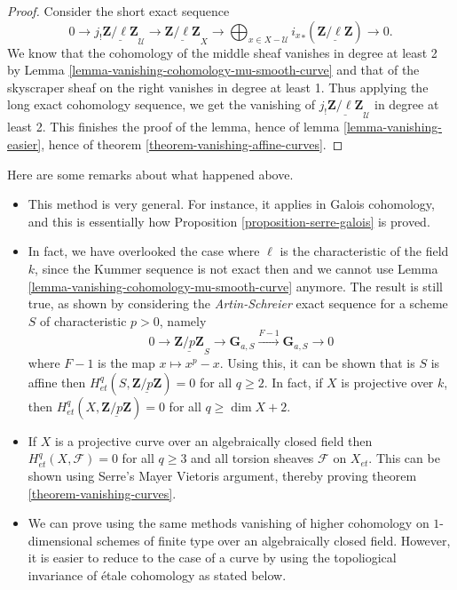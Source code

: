 \begin{proof}
Consider the short exact sequence
$$
0 \longrightarrow j_!\underline{\mathbf{Z}/\ell\mathbf{Z}}_\mathcal{U}
\longrightarrow \underline{\mathbf{Z}/\ell\mathbf{Z}}_X \longrightarrow
\bigoplus_{x \in X-\mathcal{U}} {i_x}_*(\underline{\mathbf{Z}/\ell\mathbf{Z}})
\longrightarrow 0.
$$
We know that the cohomology of the middle sheaf vanishes in degree at least 2
by
Lemma \ref{lemma-vanishing-cohomology-mu-smooth-curve}
and that of the skyscraper
sheaf on the right vanishes in degree at least 1. Thus applying the long exact
cohomology sequence, we get the vanishing of
$j_!\underline{\mathbf{Z}/\ell\mathbf{Z}}_\mathcal{U}$ in degree at least 2.
This finishes the proof of the lemma, hence of lemma
\ref{lemma-vanishing-easier}, hence of theorem
\ref{theorem-vanishing-affine-curves}.
\end{proof}

\begin{remarks}
\label{remarks-on-above}
Here are some remarks about what happened above.
\begin{itemize}
\item This method is very general. For instance, it applies in Galois
cohomology, and this is essentially how
Proposition \ref{proposition-serre-galois} is proved.
\item In fact, we have overlooked the case where $\ell$ is the characteristic
of the field $k$, since the Kummer sequence is not exact then and we cannot
use Lemma \ref{lemma-vanishing-cohomology-mu-smooth-curve} anymore.
The result is still true, as shown by considering the
{\it Artin-Schreier} exact sequence for a scheme $S$ of characteristic
$p >0$, namely
$$
0 \longrightarrow \underline{\mathbf{Z}/p\mathbf{Z}}_S \longrightarrow
\mathbf{G}_{a,S} \xrightarrow{F-1} \mathbf{G}_{a,S} \longrightarrow 0
$$
where $F - 1$ is the map $x \mapsto x^p - x$. Using this, it can be
shown that is
$S$ is affine then $H_{et}^q(S,\underline{\mathbf{Z}/p\mathbf{Z}}) = 0$ for all
$q \geq 2$. In fact, if $X$ is projective over $k$, then
$H_{et}^q(X,\underline{\mathbf{Z}/p\mathbf{Z}}) = 0$ for all $q \geq \dim X+2$.
\item If $X$ is a projective curve over an algebraically closed field then
$H_{et}^q(X,\mathcal{F}) = 0$ for all $q \geq 3$ and all torsion sheaves
$\mathcal{F}$ on $X_{et}$. This can be shown using Serre's Mayer Vietoris
argument, thereby proving theorem \ref{theorem-vanishing-curves}.
\item We can prove using the same methods vanishing of higher cohomology
on $1$-dimensional schemes of finite type over an algebraically closed field.
However, it is easier to reduce to the case of a curve by using the
topoliogical invariance of \'etale cohomology as stated below.
\end{itemize}
\end{remarks}

